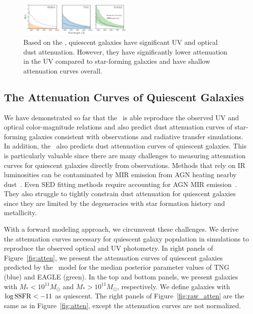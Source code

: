 \begin{figure}
\begin{center}
    \includegraphics[width=0.5\textwidth]{figs/abc_q_atten_unnorm.pdf}
    \caption{\label{fig:q_raw_atten}
    Based on the \eda, quiescent galaxies have
    significant UV and optical dust attenuation. However, they have 
    significantly lower attenuation in the UV compared to star-forming 
    galaxies and have shallow attenuation curves overall.
    }
\end{center}
\end{figure}
\subsection{The Attenuation Curves of Quiescent Galaxies}  
We have demonstrated so far that the \eda~is able reproduce the observed UV and
optical color-magnitude relations and also predict dust attenuation curves
of star-forming galaxies consistent with observations and radiative transfer 
simulations. In addition, the \eda~also predicts dust attenuation curves of
quiescent galaxies. This is particularly valuable since there are many challenges 
to measuring attenuation curves for quiescent galaxies directly from observations. 
Methods that rely on IR luminosities can be contaminated by MIR emission from AGN
heating nearby dust~\citep{kirkpatrick2015}. Even SED fitting methods require 
accounting for AGN MIR emission~\citep{salim2016, leja2018, salim2018}. They
also struggle to tightly constrain dust attenuation for quiescent 
galaxies since they are limited by the degeneracies with star formation history and 
metallicity.

With a forward modeling approach, we circumvent these challenges. We derive the 
attenuation curves necessary for quiescent galaxy population in simulations to
reproduce the observed optical and UV photometry.  In right panels of
Figure~\ref{fig:atten}, we present the attenuation curves of quiescent galaxies 
predicted by the \eda~model for the median posterior parameter values of TNG (blue) 
and EAGLE (green). In the top and bottom panels, we present galaxies with 
$M_* < 10^{11} M_\odot$ and $M_* > 10^{11} M_\odot$, respectively. 
We define galaxies with $\log {\rm SSFR} < -11$ as quiescent. The right panels 
of Figure~\ref{fig:raw_atten} are the same as in Figure~\ref{fig:atten}, except
the attenuation curves are not normalized. 

